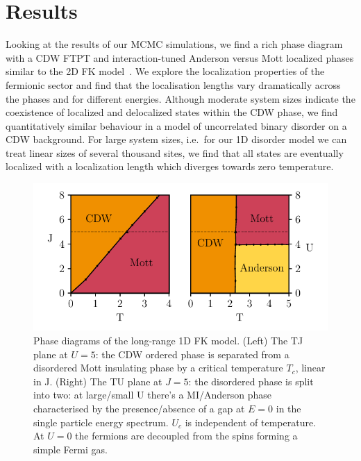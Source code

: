 \hypertarget{sec:lrfk-results}{%
\section{Results}\label{sec:lrfk-results}}

Looking at the results of our MCMC simulations, we find a rich phase diagram with a CDW FTPT and interaction-tuned Anderson versus Mott localized phases similar to the 2D FK model~\autocite{antipovInteractionTunedAndersonMott2016}. We explore the localization properties of the fermionic sector and find that the localisation lengths vary dramatically across the phases and for different energies. Although moderate system sizes indicate the coexistence of localized and delocalized states within the CDW phase, we find quantitatively similar behaviour in a model of uncorrelated binary disorder on a CDW background. For large system sizes, i.e.~for our 1D disorder model we can treat linear sizes of several thousand sites, we find that all states are eventually localized with a localization length which diverges towards zero temperature.

\hypertarget{fig:phase-diagram-lrfk}{%
\begin{figure}
\centering
\includegraphics[width=1\textwidth,height=\textheight]{figure_code/fk_chapter/phase_diagram/phase_diagram}
\caption[{Long Range Falicov Kimball Model Phase Diagram}]{Phase diagrams of the long-range 1D FK model. (Left) The TJ plane at \(U = 5\): the CDW ordered phase is separated from a disordered Mott insulating phase by a critical temperature \(T_c\), linear in J. (Right) The TU plane at \(J = 5\): the disordered phase is split into two: at large/small U there's a MI/Anderson phase characterised by the presence/absence of a gap at \(E=0\) in the single particle energy spectrum. \(U_c\) is independent of temperature. At \(U = 0\) the fermions are decoupled from the spins forming a simple Fermi gas.}
\label{fig:phase-diagram-lrfk}
\end{figure}
}

